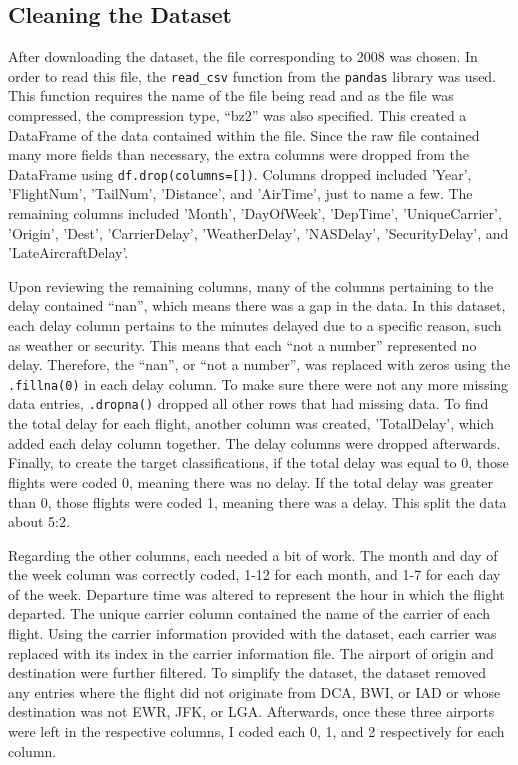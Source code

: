 \documentclass[journal]{IEEEtran}
\begin{document}
\subsection{Cleaning the Dataset}

After downloading the dataset, the file corresponding to 2008 was chosen. In order to read this file, the \lstinline{read_csv} function from the \lstinline{pandas} library was used. This function requires the name of the file being read and as the file was compressed, the compression type, “bz2” was also specified. This created a DataFrame of the data contained within the file. Since the raw file contained many more fields than necessary, the extra columns were dropped from the DataFrame using \lstinline{df.drop(columns=[])}. Columns dropped included 'Year', 'FlightNum', 'TailNum', 'Distance', and 'AirTime', just to name a few. The remaining columns included 'Month', 'DayOfWeek', 'DepTime', 'UniqueCarrier', 'Origin', 'Dest', 'CarrierDelay', 'WeatherDelay', 'NASDelay', 'SecurityDelay', and 'LateAircraftDelay'.

Upon reviewing the remaining columns, many of the columns pertaining to the delay contained “nan”, which means there was a gap in the data. In this dataset, each delay column pertains to the minutes delayed due to a specific reason, such as weather or security. This means that each “not a number” represented no delay. Therefore, the “nan”, or “not a number”, was replaced with zeros using the \lstinline{.fillna(0)} in each delay column. To make sure there were not any more missing data entries, \lstinline{.dropna()} dropped all other rows that had missing data. To find the total delay for each flight, another column was created, 'TotalDelay', which added each delay column together. The delay columns were dropped afterwards. Finally, to create the target classifications, if the total delay was equal to 0, those flights were coded 0, meaning there was no delay. If the total delay was greater than 0, those flights were coded 1, meaning there was a delay. This split the data about 5:2. 

Regarding the other columns, each needed a bit of work. The month and day of the week column was correctly coded, 1-12 for each month, and 1-7 for each day of the week. Departure time was altered to represent the hour in which the flight departed. The unique carrier column contained the name of the carrier of each flight. Using the carrier information provided with the dataset, each carrier was replaced with its index in the carrier information file. The airport of origin and destination were further filtered. To simplify the dataset, the dataset removed any entries where the flight did not originate from DCA, BWI, or IAD or whose destination was not EWR, JFK, or LGA. Afterwards, once these three airports were left in the respective columns, I coded each 0, 1, and 2 respectively for each column. 
\end{document}
